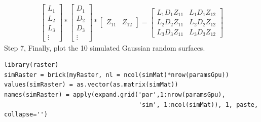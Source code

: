 \documentclass[article,nojss]{jss}\usepackage[]{graphicx}\usepackage[]{color}
\makeatletter
\newenvironment{kframe}{%
 \def\at@end@of@kframe{}%
 \ifinner\ifhmode%
  \def\at@end@of@kframe{\end{minipage}}%
  \begin{minipage}{\columnwidth}%
 \fi\fi%
 \def\FrameCommand##1{\hskip\@totalleftmargin \hskip-\fboxsep
 \colorbox{shadecolor}{##1}\hskip-\fboxsep
     \hskip-\linewidth \hskip-\@totalleftmargin \hskip\columnwidth}%
 \MakeFramed {\advance\hsize-\width
   \@totalleftmargin\z@ \linewidth\hsize
   \@setminipage}}%
 {\par\unskip\endMakeFramed%
 \at@end@of@kframe}
\newenvironment{knitrout}{}{} %
\makeatother
\begin{document}
\begin{gather}
 \begin{bmatrix}  L_{1} \\ L_{2} \\L_{3} \\ \vdots
 \end{bmatrix} 
 *
  \begin{bmatrix}
   D_{1} \\ D_{2} \\D_{3} \\ \vdots
   \end{bmatrix} 
   *
   \begin{bmatrix}
   Z_{11} & Z_{12}
   \end{bmatrix}
  =
 \begin{bmatrix}
   L_1D_1Z_{11} & L_1D_1Z_{12} \\
   L_2D_2Z_{11} & L_2D_2Z_{12} \\
   L_3D_3Z_{11} & L_3D_3Z_{12} 
  \end{bmatrix}
\end{gather}
Step 7, Finally, plot the 10 simulated Gaussian random surfaces.
\begin{knitrout}
\color{fgcolor}\begin{kframe}
\begin{verbatim}
library(raster)
simRaster = brick(myRaster, nl = ncol(simMat)*nrow(paramsGpu))
values(simRaster) = as.vector(as.matrix(simMat))
names(simRaster) = apply(expand.grid('par',1:nrow(paramsGpu), 
                                     'sim', 1:ncol(simMat)), 1, paste, collapse='')
\end{verbatim}
\end{kframe}
\end{knitrout}
\end{document}

